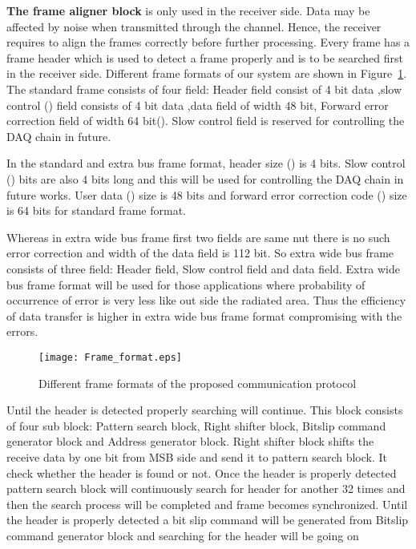 \documentclass[10pt, conference, compsocconf]{IEEEtran}
\begin{document}
\iffalse

\par \textbf{The frame aligner block} is only used in the receiver side. Data may be affected by noise when transmitted through the channel. Hence, the receiver requires to align the frames correctly before further processing. Every frame has a frame header which is used to detect a frame properly and is to be searched first in the receiver side. Different frame formats of our system are shown in Figure~\ref{fig:frameformat}. The standard frame consists of four field: Header field consist of 4 bit data ,slow control () field consists of 4 bit data ,data field of width 48 bit, Forward error correction field of width 64 bit(). 
Slow control field is reserved for controlling the DAQ chain in future.

In  the standard and extra bus frame format, header size () is 4 bits. Slow control () bits are also 4 bits long and this will be used for controlling the DAQ chain in future works. User data () size is 48 bits and forward error correction code () size is 64 bits for standard frame format.

  Whereas in extra wide bus frame first two fields are same nut there is no such error correction and width of the data field is 112 bit. So extra wide bus frame consists of three field: Header field, Slow control field and data field.  Extra wide bus frame format will be used for those applications where probability of occurrence of error is very less like out side the radiated area. Thus the efficiency of data transfer is higher in extra wide bus frame format compromising with the errors.
\begin{figure}[h]
\centering
\texttt{[image: Frame\_format.eps]}
\caption{Different frame formats of the proposed communication protocol}
\vspace*{-8pt}
\label{fig:frameformat}
\end{figure}
Until the header is detected properly searching will continue. This block consists of four sub block: Pattern search block, Right shifter block, Bitslip command generator block and Address generator block. Right shifter block shifts the receive data by one bit from MSB side and send it to pattern search block. It check whether the header is found or not. Once the header is properly detected pattern search block will continuously search for header for another 32 times and then the search process will be completed and frame becomes synchronized. Until the header is properly detected a bit slip command will be generated from Bitslip command generator block and searching for the header will be going on
\end{document}
